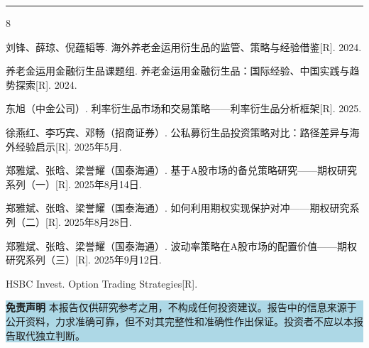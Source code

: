 \documentclass[10pt,a4paper,twocolumn]{ctexart}
\begin{document}
\vspace{8pt}
\noindent\textcolor{themeblue}{\rule{\columnwidth}{1.2pt}}
\vspace{2pt}

\begin{thebibliography}{8}
\small
\setlength{\itemsep}{2pt}

 刘锋、薛琼、倪蕴韬等. 海外养老金运用衍生品的监管、策略与经验借鉴[R]. 2024.

 养老金运用金融衍生品课题组. 养老金运用金融衍生品：国际经验、中国实践与趋势探索[R]. 2024.

 东旭（中金公司）. 利率衍生品市场和交易策略——利率衍生品分析框架[R]. 2025.

 徐燕红、李巧宾、邓畅（招商证券）. 公私募衍生品投资策略对比：路径差异与海外经验启示[R]. 2025年5月.

 郑雅斌、张晗、梁誉耀（国泰海通）. 基于A股市场的备兑策略研究——期权研究系列（一）[R]. 2025年8月14日.

 郑雅斌、张晗、梁誉耀（国泰海通）. 如何利用期权实现保护对冲——期权研究系列（二）[R]. 2025年8月28日.

 郑雅斌、张晗、梁誉耀（国泰海通）. 波动率策略在A股市场的配置价值——期权研究系列（三）[R]. 2025年9月12日.

 HSBC Invest. Option Trading Strategies[R].

\end{thebibliography}

\vspace{6pt}
\noindent\colorbox{lightblue}{%
\parbox{\columnwidth}{\small\vspace{4pt}
\textbf{\color{themeblue}免责声明}\quad
本报告仅供研究参考之用，不构成任何投资建议。报告中的信息来源于公开资料，力求准确可靠，但不对其完整性和准确性作出保证。投资者不应以本报告取代独立判断。
\vspace{4pt}}}
\end{document}
